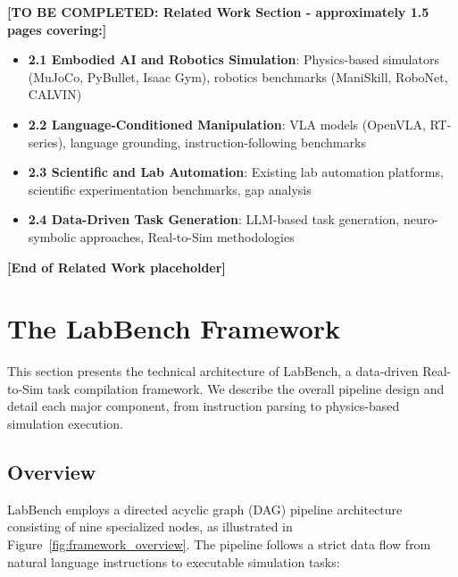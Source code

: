 \documentclass[letterpaper]{article} %
\begin{document}
\textbf{[TO BE COMPLETED: Related Work Section - approximately 1.5 pages covering:]}
\begin{itemize}
    \item \textbf{2.1 Embodied AI and Robotics Simulation}: Physics-based simulators (MuJoCo, PyBullet, Isaac Gym), robotics benchmarks (ManiSkill, RoboNet, CALVIN)
    \item \textbf{2.2 Language-Conditioned Manipulation}: VLA models (OpenVLA, RT-series), language grounding, instruction-following benchmarks
    \item \textbf{2.3 Scientific and Lab Automation}: Existing lab automation platforms, scientific experimentation benchmarks, gap analysis
    \item \textbf{2.4 Data-Driven Task Generation}: LLM-based task generation, neuro-symbolic approaches, Real-to-Sim methodologies
\end{itemize}
\textbf{[End of Related Work placeholder]}

\section{The LabBench Framework}
\label{sec:framework}

This section presents the technical architecture of LabBench, a data-driven Real-to-Sim task compilation framework. We describe the overall pipeline design and detail each major component, from instruction parsing to physics-based simulation execution.

\subsection{Overview}

LabBench employs a directed acyclic graph (DAG) pipeline architecture consisting of nine specialized nodes, as illustrated in Figure~\ref{fig:framework_overview}. The pipeline follows a strict data flow from natural language instructions to executable simulation tasks:
\end{document}
